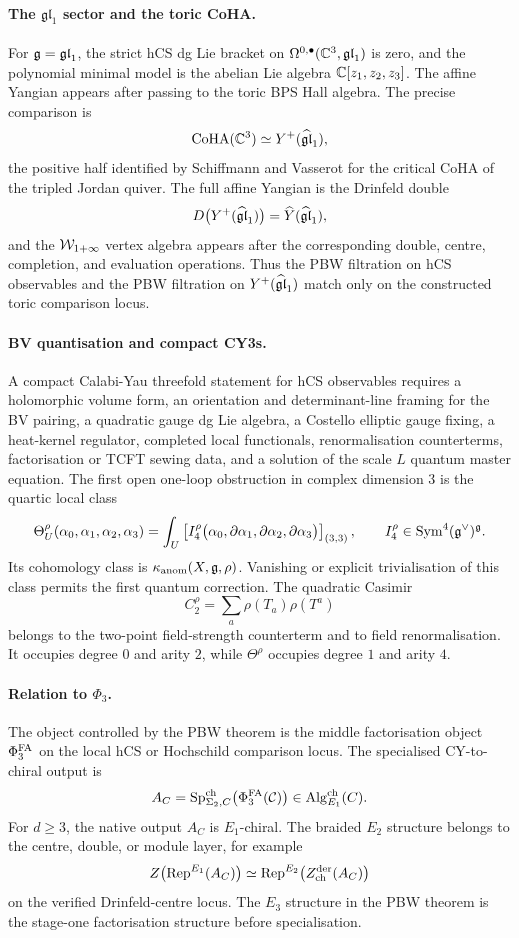 \paragraph{The \(\mathfrak{gl}_1\) sector and the toric CoHA.}
For \(\mathfrak{g}=\mathfrak{gl}_1\), the strict hCS dg Lie bracket on
\(\Omega^{0,\bullet}(\mathbb{C}^3,\mathfrak{gl}_1)\) is zero, and the polynomial minimal
model is the abelian Lie algebra \(\mathbb{C}[z_1,z_2,z_3]\). The affine Yangian
appears after passing to the toric BPS Hall algebra. The precise
comparison is
\[
  \mathrm{CoHA}(\mathbb{C}^3)\simeq Y^+(\widehat{\mathfrak{gl}}_1),
\]
the positive half identified by Schiffmann and Vasserot for the critical
CoHA of the tripled Jordan quiver. The full affine Yangian is the
Drinfeld double
\[
  D\bigl(Y^+(\widehat{\mathfrak{gl}}_1)\bigr)=\widehat Y(\widehat{\mathfrak{gl}}_1),
\]
and the \(\mathcal{W}_{1+\infty}\) vertex algebra appears after the corresponding
double, centre, completion, and evaluation operations. Thus the PBW
filtration on hCS observables and the PBW filtration on \(Y^+(\widehat{\mathfrak{gl}}_1)\)
match only on the constructed toric comparison locus.

\paragraph{BV quantisation and compact CY3s.}
A compact Calabi-Yau threefold statement for hCS observables requires a
holomorphic volume form, an orientation and determinant-line framing for
the BV pairing, a quadratic gauge dg Lie algebra, a Costello elliptic
gauge fixing, a heat-kernel regulator, completed local functionals,
renormalisation counterterms, factorisation or TCFT sewing data, and a
solution of the scale \(L\) quantum master equation. The first open
one-loop obstruction in complex dimension \(3\) is the quartic local
class
\[
  \Theta^\rho_U(\alpha_0,\alpha_1,\alpha_2,\alpha_3)
  =
  \int_U
  \left[
  I_4^\rho\bigl(
    \alpha_0,\partial\alpha_1,\partial\alpha_2,\partial\alpha_3
  \bigr)
  \right]_{(3,3)},
  \qquad
  I_4^\rho\in\mathrm{Sym}^4(\mathfrak{g}^\vee)^{\mathfrak{g}} .
\]
Its cohomology class is \(\kappa_{\mathrm{anom}}(X,\mathfrak{g},\rho)\). Vanishing or explicit
trivialisation of this class permits the first quantum correction. The
quadratic Casimir
\[
  C_2^\rho=\sum_a \rho(T_a)\rho(T^a)
\]
belongs to the two-point field-strength counterterm and to field
renormalisation. It occupies degree \(0\) and arity \(2\), while
\(\Theta^\rho\) occupies degree \(1\) and arity \(4\).

\paragraph{Relation to \(\Phi_3\).}
The object controlled by the PBW theorem is the middle factorisation
object \(\Phi^{\mathrm{FA}}_3\) on the local hCS or Hochschild comparison locus. The
specialised CY-to-chiral output is
\[
  A_C=
  \mathrm{Sp}^{\mathrm{ch}}_{\Sigma_2,C}\bigl(\Phi^{\mathrm{FA}}_3(\mathcal C)\bigr)
  \in \mathrm{Alg}^{\mathrm{ch}}_{E_1}(C).
\]
For \(d\geq3\), the native output \(A_C\) is \(E_1\)-chiral. The braided
\(E_2\) structure belongs to the centre, double, or module layer, for
example
\[
  Z\bigl(\mathrm{Rep}^{E_1}(A_C)\bigr)
  \simeq
  \mathrm{Rep}^{E_2}\bigl(Z^{\mathrm{der}}_{\mathrm{ch}}(A_C)\bigr)
\]
on the verified Drinfeld-centre locus. The \(E_3\) structure in the PBW
theorem is the stage-one factorisation structure before specialisation.

